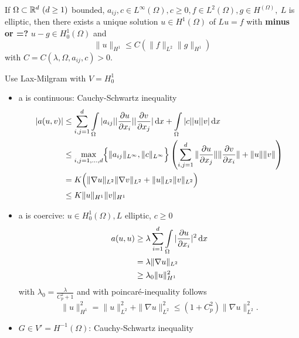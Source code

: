 \begin{enumerate}[=(\alph*)]
	\begin{thrm}
		If $\Omega \subset \mathbb{R}^d\ (d\geq1)$ bounded, $a_{ij},c \in L^\infty(\Omega), c\geq 0, f\in L^2(\Omega), g\in H^(\Omega),\ L$ is elliptic, then there exists a unique solution $u \in H^1(\Omega)$ of $Lu=f$ with \textbf{minus or =? } $u-g \in H^1_0(\Omega)$ and 
		\begin{equation*}
			\|u\|_{H^1} \leq C\left( \|f\|_{L^2} \|g\|_{H^1} \right)
		\end{equation*}  
		with $C = C(\lambda, \Omega,a_{ij},c)>0$.
	\end{thrm}

	\begin{proof_}
		Use Lax-Milgram with $V = H^1_0$
		\begin{itemize}
			\item a is continuous:\enter
			Cauchy-Schwartz inequality
			\begin{align*}
				|a(u,v)| &\leq \displaystyle \sum^d_{i,j=1} \int \limits_\Omega |a_{ij}| |\frac{\partial u}{\partial x_i}| |\frac{\partial v}{\partial x_j}| \mathop{}\!\mathrm{d} x + \int \limits_\Omega |c||u||v| \mathop{}\!\mathrm{d} x \\
				& \leq \underset{i,j = 1,\dots,d}{\text{max}} \Big\{ \|a_{ij}\|_{L^\infty}, \|c\|_{L^\infty} \Big\}\left( \displaystyle \sum^d_{i,j=1} \|\frac{\partial u}{\partial x_j}\| \|\frac{\partial v}{\partial x_i}\| + \|u\|\|v\| \right)\\
				&= K \Big ( \|\nabla u\|_{L^2}\|\nabla v\|_{L^2} + \|u\|_{L^2}\|v\|_{L^2} \Big )\\
				&\leq K \|u\|_{H^1}\|v\|_{H^1}
			\end{align*}
			\item a is coercive: \enter
			$ u \in H^1_0(\Omega), L$ elliptic, $c \geq 0$
			\begin{align*}
				a(u,u) &\geq \lambda \displaystyle\sum^d_{i=1} \int \limits_\Omega |\frac{\partial u}{\partial x_i}|^2 \mathop{}\!\mathrm{d} x\\
					   &= \lambda\|\nabla u\|_{L^2}\\
					   &\geq \lambda_0 \|u\|^2_{H^1}
			\end{align*}
			with $\lambda_0 = \frac{\lambda}{C^2_p +1}$ and with poincaré-inequality follows
			\begin{equation*}
				\|u\|^2_{H^1} = \|u\|^2_{L^2} + \|\nabla u\|^2_{L^2} \leq \left( 1 + C^2_p \right)\|\nabla u\|^2_{L^2}.
			\end{equation*}
			\item $G \in V' = H^{-1}(\Omega)$:\enter
			Cauchy-Schwartz inequality

\end{itemize}
\end{proof_}
\end{enumerate}
